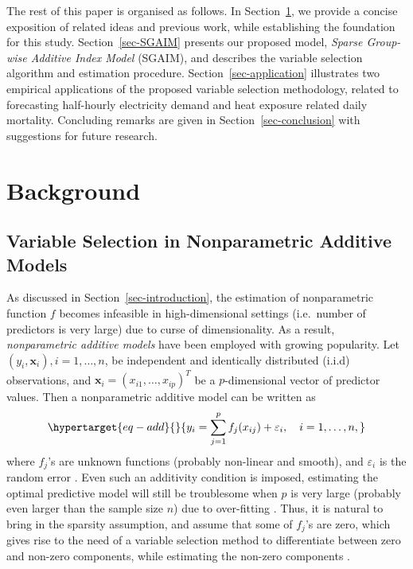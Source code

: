 \documentclass[11pt,a4paper,]{article}
\begin{document}
The rest of this paper is organised as follows. In
Section~\ref{sec-background}, we provide a concise exposition of related
ideas and previous work, while establishing the foundation for this
study. Section~\ref{sec-SGAIM} presents our proposed model, \emph{Sparse
Group-wise Additive Index Model} (SGAIM), and describes the variable
selection algorithm and estimation procedure.
Section~\ref{sec-application} illustrates two empirical applications of
the proposed variable selection methodology, related to forecasting
half-hourly electricity demand and heat exposure related daily
mortality. Concluding remarks are given in Section~\ref{sec-conclusion}
with suggestions for future research.

\hypertarget{sec-background}{%
\section{Background}\label{sec-background}}

\hypertarget{variable-selection-in-nonparametric-additive-models}{%
\subsection{Variable Selection in Nonparametric Additive
Models}\label{variable-selection-in-nonparametric-additive-models}}

As discussed in Section~\ref{sec-introduction}, the estimation of
nonparametric function \(f\) becomes infeasible in high-dimensional
settings (i.e.~number of predictors is very large) due to curse of
dimensionality. As a result, \emph{nonparametric additive models} have
been employed with growing popularity. Let
\((y_{i}, \bm{x}_{i}), i = 1, \dots, n\), be independent and identically
distributed (i.i.d) observations, and
\(\bm{x}_{i} = (x_{i1}, \dots, x_{ip})^{T}\) be a \(p\)-dimensional
vector of predictor values. Then a nonparametric additive model can be
written as \begin{equation}\protect\hypertarget{eq-add}{}{
 y_{i} = \sum_{j=1}^{p} {f_{j}(x_{ij})} + \varepsilon_{i}, \quad i = 1, \dots, n,
}\label{eq-add}\end{equation} where \(f_{j}\)'s are unknown functions
(probably non-linear and smooth), and \(\varepsilon_{i}\) is the random
error \autocite{Lian2012}. Even such an additivity condition is imposed,
estimating the optimal predictive model will still be troublesome when
\(p\) is very large (probably even larger than the sample size \(n\))
due to over-fitting \autocite{Lian2012}. Thus, it is natural to bring in
the sparsity assumption, and assume that some of \(f_{j}\)'s are zero,
which gives rise to the need of a variable selection method to
differentiate between zero and non-zero components, while estimating the
non-zero components \autocite{Huang2010}.
\end{document}
